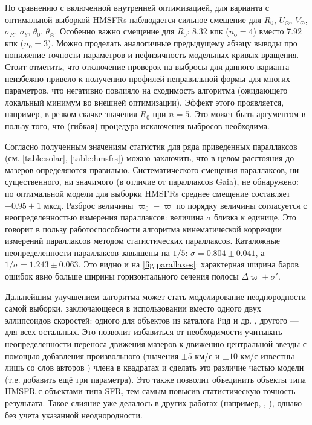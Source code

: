 \documentclass[a4paper, oneside, 14pt]{article}
\begin{document}
По сравнению с включенной внутренней оптимизацией, для варианта с оптимальной выборкой HMSFRs наблюдается сильное смещение для $ R_0 $, $ U_\odot $, $ V_\odot $, $ \sigma_R $, $ \sigma_\theta $, $ \theta_0 $, $ \theta_\odot $. Особенно важно смещение для $ R_0 $: 8.32 кпк ($ n_\text{o} = 4 $) вместо 7.92 кпк ($ n_\text{o} = 3 $). Можно проделать аналогичные предыдущему абзацу выводы про понижение точности параметров и нефизичность модельных кривых вращения. Стоит отметить, что отключение проверок на выбросы для данного варианта неизбежно привело к получению профилей неправильной формы для многих параметров, что негативно повлияло на сходимость алгоритма (ожидающего локальный минимум во внешней оптимизации). Эффект этого проявляется, например, в резком скачке значения $ R_0 $ при $ n = 5 $. Это может быть аргументом в пользу того, что (гибкая) процедура исключения выбросов необходима.

Согласно полученным значениям статистик для ряда приведенных параллаксов (см. \autoref{table:solar}, \autoref{table:hmsfrs}) можно заключить, что в целом расстояния до мазеров определяются правильно. Систематического смещения параллаксов, ни существенного, ни значимого (в отличие от параллаксов Gaia), не обнаружено: по оптимальной модели для выборки HMSFRs среднее смещение составляет $ -0.95 \pm 1 $ мксд. Разброс величины $ \varpi_0 - \varpi $ по порядку величины согласуется с неопределенностью измерения параллаксов: величина $ \sigma $ близка к единице. Это говорит в пользу работоспособности алгоритма кинематической коррекции измерений параллаксов методом статистических параллаксов. Каталожные неопределенности параллаксов завышены на $ 1 / 5 $: $ \sigma = 0.804 \pm 0.041 $, а $ 1 / \sigma = 1.243 \pm 0.063 $. Это видно и на \autoref{fig:parallaxes}: характерная ширина баров ошибок явно больше ширины горизонтального сечения полосы $ \Delta\varpi \pm \sigma' $.

Дальнейшим улучшением алгоритма может стать моделирование неоднородности самой выборки, заключающееся в использовании вместо одного двух эллипсоидов скоростей: одного для объектов из каталога Рид и др. \cite{R.2019}, другого --- для всех остальных. Это позволит избавиться от необходимости учитывать неопределенности переноса движения мазеров к движению центральной звезды с помощью добавления произвольного (значения $ \pm 5 $ км/с и $ \pm 10 $ км/с известны лишь со слов авторов \cite{R.2019}) члена в квадратах и сделать это различие частью модели (т.е. добавить ещё три параметра). Это также позволит объединить объекты типа HMSFR с объектами типа SFR, тем самым повысив статистическую точность результата. Такое слияние уже делалось в других работах (например, \cite{R.2017}, \cite{VERA.2020}), однако без учета указанной неоднородности.
\end{document}
